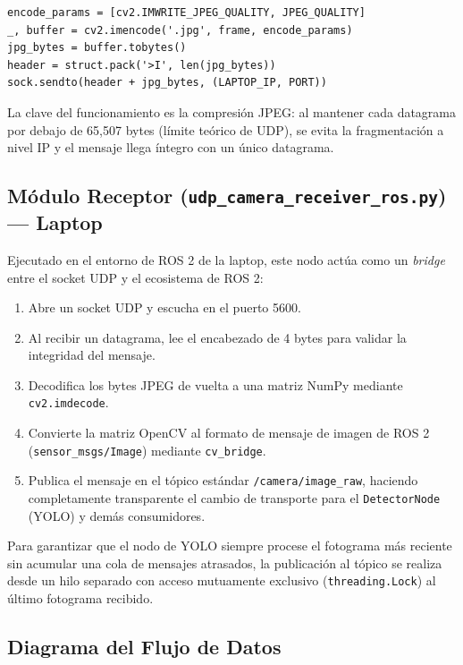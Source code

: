 \documentclass[12pt,a4paper]{article}
\begin{document}
\begin{lstlisting}[caption={Codificaci\'on y env\'io UDP del fotograma}]
encode_params = [cv2.IMWRITE_JPEG_QUALITY, JPEG_QUALITY]
_, buffer = cv2.imencode('.jpg', frame, encode_params)
jpg_bytes = buffer.tobytes()
header = struct.pack('>I', len(jpg_bytes))
sock.sendto(header + jpg_bytes, (LAPTOP_IP, PORT))
\end{lstlisting}

La clave del funcionamiento es la compresi\'on JPEG: al mantener cada datagrama por debajo de 65,507 bytes (l\'imite te\'orico de UDP), se evita la fragmentaci\'on a nivel IP y el mensaje llega \'integro con un \'unico datagrama.

\subsection{M\'odulo Receptor (\texttt{udp\_camera\_receiver\_ros.py}) --- Laptop}

Ejecutado en el entorno de ROS 2 de la laptop, este nodo act\'ua como un \textit{bridge} entre el socket UDP y el ecosistema de ROS 2:

\begin{enumerate}
    \item Abre un socket UDP y escucha en el puerto 5600.
    \item Al recibir un datagrama, lee el encabezado de 4 bytes para validar la integridad del mensaje.
    \item Decodifica los bytes JPEG de vuelta a una matriz NumPy mediante \texttt{cv2.imdecode}.
    \item Convierte la matriz OpenCV al formato de mensaje de imagen de ROS 2 (\texttt{sensor\_msgs/Image}) mediante \texttt{cv\_bridge}.
    \item Publica el mensaje en el t\'opico est\'andar \texttt{/camera/image\_raw}, haciendo completamente transparente el cambio de transporte para el \texttt{DetectorNode} (YOLO) y dem\'as consumidores.
\end{enumerate}

Para garantizar que el nodo de YOLO siempre procese el fotograma m\'as reciente sin acumular una cola de mensajes atrasados, la publicaci\'on al t\'opico se realiza desde un hilo separado con acceso mutuamente exclusivo (\texttt{threading.Lock}) al \'ultimo fotograma recibido.

\subsection{Diagrama del Flujo de Datos}
\end{document}
